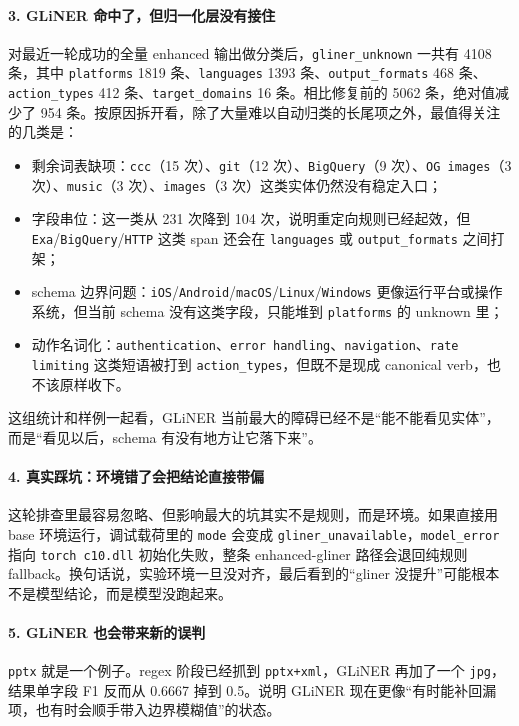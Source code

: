 \paragraph{3. GLiNER 命中了，但归一化层没有接住}
对最近一轮成功的全量 enhanced 输出做分类后，\texttt{gliner\_unknown} 一共有 4108 条，其中 \texttt{platforms} 1819 条、\texttt{languages} 1393 条、\texttt{output\_formats} 468 条、\texttt{action\_types} 412 条、\texttt{target\_domains} 16 条。相比修复前的 5062 条，绝对值减少了 954 条。按原因拆开看，除了大量难以自动归类的长尾项之外，最值得关注的几类是：
\begin{itemize}
  \item 剩余词表缺项：\texttt{ccc}（15 次）、\texttt{git}（12 次）、\texttt{BigQuery}（9 次）、\texttt{OG images}（3 次）、\texttt{music}（3 次）、\texttt{images}（3 次）这类实体仍然没有稳定入口；
  \item 字段串位：这一类从 231 次降到 104 次，说明重定向规则已经起效，但 \texttt{Exa}/\texttt{BigQuery}/\texttt{HTTP} 这类 span 还会在 \texttt{languages} 或 \texttt{output\_formats} 之间打架；
  \item schema 边界问题：\texttt{iOS}/\texttt{Android}/\texttt{macOS}/\texttt{Linux}/\texttt{Windows} 更像运行平台或操作系统，但当前 schema 没有这类字段，只能堆到 \texttt{platforms} 的 unknown 里；
  \item 动作名词化：\texttt{authentication}、\texttt{error handling}、\texttt{navigation}、\texttt{rate limiting} 这类短语被打到 \texttt{action\_types}，但既不是现成 canonical verb，也不该原样收下。
\end{itemize}

这组统计和样例一起看，GLiNER 当前最大的障碍已经不是“能不能看见实体”，而是“看见以后，schema 有没有地方让它落下来”。

\paragraph{4. 真实踩坑：环境错了会把结论直接带偏}
这轮排查里最容易忽略、但影响最大的坑其实不是规则，而是环境。如果直接用 base 环境运行，调试载荷里的 \texttt{mode} 会变成 \texttt{gliner\_unavailable}，\texttt{model\_error} 指向 \texttt{torch c10.dll} 初始化失败，整条 enhanced-gliner 路径会退回纯规则 fallback。换句话说，实验环境一旦没对齐，最后看到的“gliner 没提升”可能根本不是模型结论，而是模型没跑起来。

\paragraph{5. GLiNER 也会带来新的误判}
\texttt{pptx} 就是一个例子。regex 阶段已经抓到 \texttt{pptx+xml}，GLiNER 再加了一个 \texttt{jpg}，结果单字段 F1 反而从 0.6667 掉到 0.5。说明 GLiNER 现在更像“有时能补回漏项，也有时会顺手带入边界模糊值”的状态。

